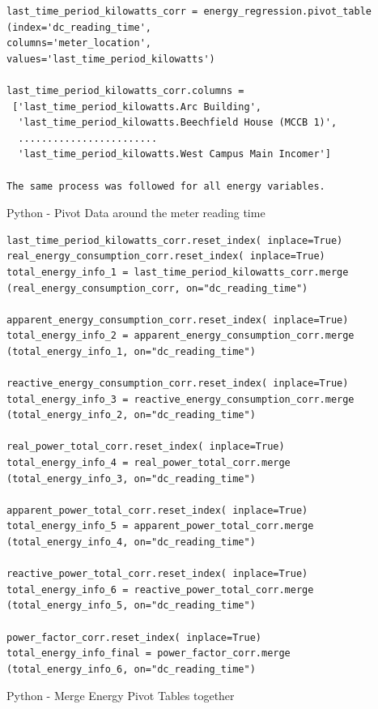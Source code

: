\documentclass[12pt]{scrartcl}
\begin{document}
\begin{listing}[H]
\begin{verbatim}
last_time_period_kilowatts_corr = energy_regression.pivot_table
(index='dc_reading_time',
columns='meter_location',
values='last_time_period_kilowatts')

last_time_period_kilowatts_corr.columns =
 ['last_time_period_kilowatts.Arc Building',
  'last_time_period_kilowatts.Beechfield House (MCCB 1)',
  ........................
  'last_time_period_kilowatts.West Campus Main Incomer']
    
The same process was followed for all energy variables.

\end{verbatim}
\caption{Python - Pivot Data around the meter reading time}
\label{list:[Python - Pivot Data around the meter reading time]}
\end{listing}

\begin{listing}[H]
\begin{verbatim}
last_time_period_kilowatts_corr.reset_index( inplace=True)
real_energy_consumption_corr.reset_index( inplace=True)
total_energy_info_1 = last_time_period_kilowatts_corr.merge
(real_energy_consumption_corr, on="dc_reading_time")

apparent_energy_consumption_corr.reset_index( inplace=True)
total_energy_info_2 = apparent_energy_consumption_corr.merge
(total_energy_info_1, on="dc_reading_time")

reactive_energy_consumption_corr.reset_index( inplace=True)
total_energy_info_3 = reactive_energy_consumption_corr.merge
(total_energy_info_2, on="dc_reading_time")

real_power_total_corr.reset_index( inplace=True)
total_energy_info_4 = real_power_total_corr.merge
(total_energy_info_3, on="dc_reading_time")

apparent_power_total_corr.reset_index( inplace=True)
total_energy_info_5 = apparent_power_total_corr.merge
(total_energy_info_4, on="dc_reading_time")

reactive_power_total_corr.reset_index( inplace=True)
total_energy_info_6 = reactive_power_total_corr.merge
(total_energy_info_5, on="dc_reading_time")

power_factor_corr.reset_index( inplace=True)
total_energy_info_final = power_factor_corr.merge
(total_energy_info_6, on="dc_reading_time")

\end{verbatim}
\caption{Python - Merge Energy Pivot Tables together}
\label{list:[Python - Merge Energy Pivot Tables together]}
\end{listing}
\end{document}
